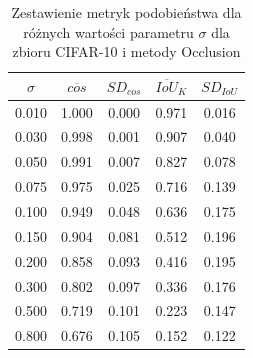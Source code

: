 \begin{table}[H] \centering \caption{Zestawienie metryk podobieństwa dla różnych wartości parametru \(\sigma\) dla zbioru CIFAR-10 i metody Occlusion} \label{tab:occ_sg_cos_topk_cifar10} \begin{tabular}{ccccc} \toprule $\sigma$ & $\overline{cos}$ & $SD_{cos}$ & $\overline{IoU}_{K}$ & $SD_{IoU}$ \\ \midrule 0.010 & 1.000 & 0.000 & 0.971 & 0.016 \\ 0.030 & 0.998 & 0.001 & 0.907 & 0.040 \\ 0.050 & 0.991 & 0.007 & 0.827 & 0.078 \\ 0.075 & 0.975 & 0.025 & 0.716 & 0.139 \\ 0.100 & 0.949 & 0.048 & 0.636 & 0.175 \\ 0.150 & 0.904 & 0.081 & 0.512 & 0.196 \\ 0.200 & 0.858 & 0.093 & 0.416 & 0.195 \\ 0.300 & 0.802 & 0.097 & 0.336 & 0.176 \\ 0.500 & 0.719 & 0.101 & 0.223 & 0.147 \\ 0.800 & 0.676 & 0.105 & 0.152 & 0.122 \\ \bottomrule \end{tabular} \end{table}

